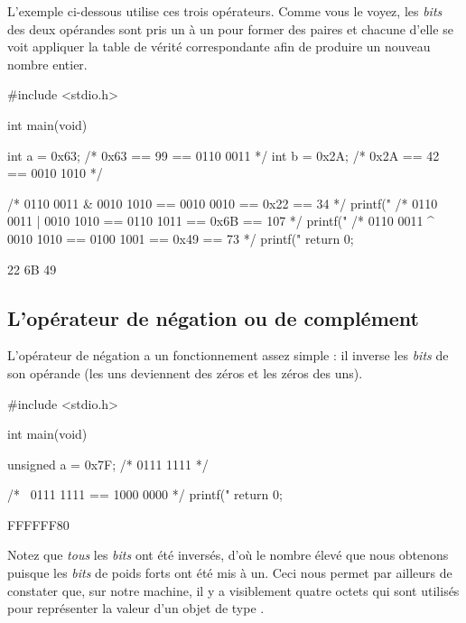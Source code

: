 L'exemple ci-dessous utilise ces trois opérateurs. Comme vous le voyez,
les \emph{bits} des deux opérandes sont pris un à un pour former des
paires et chacune d'elle se voit appliquer la table de vérité
correspondante afin de produire un nouveau nombre entier.

\begin{C}
#include <stdio.h>


int main(void)
{
    int a = 0x63; /* 0x63 == 99 == 0110 0011 */
    int b = 0x2A; /* 0x2A == 42 == 0010 1010 */

    /* 0110 0011 & 0010 1010 == 0010 0010 == 0x22 == 34 */
    printf("%
    /* 0110 0011 | 0010 1010 == 0110 1011 == 0x6B == 107 */
    printf("%
    /* 0110 0011 ^ 0010 1010 == 0100 1001 == 0x49 == 73 */
    printf("%
    return 0;
}
\end{C}

\begin{C}
22
6B
49
\end{C}

\subsection{L'opérateur de négation ou de complément}
\label{loperateur-de-negation-ou-de-complement}

L'opérateur de négation a un fonctionnement assez simple : il inverse
les \emph{bits} de son opérande (les uns deviennent des zéros et les
zéros des uns).

\begin{C}
#include <stdio.h>


int
main(void)
{
    unsigned a = 0x7F; /* 0111 1111 */

    /* ~0111 1111 == 1000 0000 */
    printf("%
    return 0;
}
\end{C}

\begin{C}
FFFFFF80
\end{C}

\begin{attentionbox}
  Notez que \emph{tous} les \emph{bits}
ont été inversés, d'où le nombre élevé que nous obtenons puisque les
\emph{bits} de poids forts ont été mis à un. Ceci nous permet par
ailleurs de constater que, sur notre machine, il y a visiblement quatre
octets qui sont utilisés pour représenter la valeur d'un objet de type
.
\end{attentionbox}


